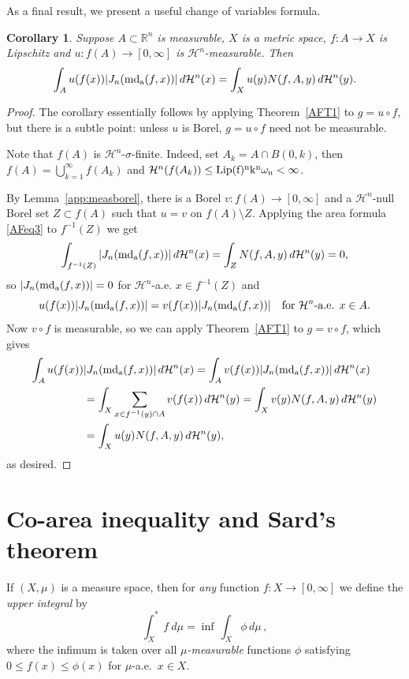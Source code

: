 \documentclass[12pt,leqno]{amsart}
\newtheorem{corollary}[theorem]{Corollary}
\theoremstyle{definition}
\newcommand{\bbbr}{\mathbb R}
\def\H{{\mathcal H}}
\def\apmd{\operatorname{md_{\rm a}}}
\numberwithin{theorem}{section} \numberwithin{equation}{section}
\begin{document}
As a final result, we present a useful change of variables formula. \begin{corollary}
\label{gum14}
Suppose $A\subset\bbbr^n$ is measurable, $X$ is a metric space, $f:A\to X$ is Lipschitz and $u:f(A)\to [0,\infty]$ is $\H^n$-measurable. Then
$$
\int_A u(f(x))|J_n(\apmd (f,x))|\,d\H^n(x)=\int_Xu(y) N(f,A,y)\,d\H^n(y).
$$
\end{corollary}
\begin{proof}
The corollary essentially follows by applying Theorem~\ref{AFT1} to $g=u\circ f$, but there is a subtle point: unless $u$ is Borel, $g=u\circ f$ need not be measurable.

Note that $f(A)$ is $\H^n$-$\sigma$-finite. Indeed, set $A_k=A\cap B(0,k)$, then $f(A)=\bigcup_{k=1}^\infty f(A_k)$ and $\H^n(f(A_k))\leq \rm{Lip}(f)^n k^n\omega_n<\infty$.

By Lemma~\ref{app:measborel}, there is  a Borel $v:f(A)\to [0,\infty]$ and a $\H^n$-null Borel set $Z\subset f(A)$ such that $u=v$ on $f(A)\setminus Z$. Applying the area formula \eqref{AFeq3} to $f^{-1}(Z)$ we get
$$
\int_{f^{-1}(Z)}|J_n(\apmd(f,x))|\,d\H^n(x)=\int_Z N(f,A,y)\,d\H^n(y)=0,
$$
so $|J_n(\apmd(f,x))|=0$ for $\H^n$-a.e. $x\in f^{-1}(Z)$ and
$$
u(f(x))|J_n(\apmd(f,x))|=v(f(x))|J_n(\apmd(f,x))|\quad \text{for $\H^n$-a.e. }x\in A.
$$
Now $v\circ f$ is measurable, so we can apply Theorem~\ref{AFT1} to $g=v\circ f$, which gives
\begin{equation*}
    \begin{split}
\int_A u(f(x))&|J_n(\apmd(f,x))|\,d\H^n(x)=\int_A v(f(x))|J_n(\apmd(f,x))|\,d\H^n(x)\\
&=\int_X\sum_{x\in f^{-1}(y)\cap A}v(f(x))\,d\H^n(y)=\int_X v(y)N(f,A,y)\,d\H^n(y)\\
&=\int_X u(y)N(f,A,y)\,d\H^n(y),
    \end{split}
\end{equation*}
as desired.
\end{proof}

\section{Co-area inequality and Sard's theorem}
\label{coarea}
If $(X,\mu)$ is a measure space, then for {\em any} function $f:X\to [0,\infty]$ we define the {\em upper integral} by
$$
\int^*_X f \ d\mu = \inf \, \int_X \phi \, d\mu \, ,
$$
where the infimum is taken over all {\em $\mu$-measurable} functions $\phi$ satisfying $0 \leq f(x) \leq \phi(x)$ for $\mu$-a.e.\ $x \in X$.
\end{document}
